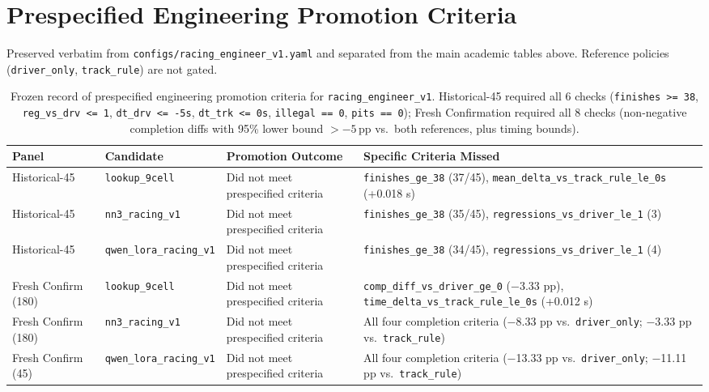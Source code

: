 \documentclass[11pt,a4paper]{article}
\begin{document}
\appendix
\section{Prespecified Engineering Promotion Criteria}

Preserved verbatim from \texttt{configs/racing\_engineer\_v1.yaml} and separated from the main academic tables above. Reference policies (\texttt{driver\_only}, \texttt{track\_rule}) are not gated.

\begin{table}[htbp]
\centering
\caption{Frozen record of prespecified engineering promotion criteria for \texttt{racing\_engineer\_v1}. Historical-45 required all 6 checks (\texttt{finishes >= 38}, \texttt{reg\_vs\_drv <= 1}, \texttt{dt\_drv <= -5s}, \texttt{dt\_trk <= 0s}, \texttt{illegal == 0}, \texttt{pits == 0}); Fresh Confirmation required all 8 checks (non-negative completion diffs with 95\% lower bound $>-5$\,pp vs.\ both references, plus timing bounds).}
\label{tab:appendix_gates}
\footnotesize
\begin{tabular}{ll>{\raggedright\arraybackslash}p{4.0cm}>{\raggedright\arraybackslash}p{6.0cm}}
\toprule
Panel & Candidate & Promotion Outcome & Specific Criteria Missed \\
\midrule
Historical-45 & \texttt{lookup\_9cell} & Did not meet prespecified criteria & \texttt{finishes\_ge\_38} (37/45), \texttt{mean\_delta\_vs\_track\_rule\_le\_0s} (+0.018 s) \\
Historical-45 & \texttt{nn3\_racing\_v1} & Did not meet prespecified criteria & \texttt{finishes\_ge\_38} (35/45), \texttt{regressions\_vs\_driver\_le\_1} (3) \\
Historical-45 & \texttt{qwen\_lora\_racing\_v1} & Did not meet prespecified criteria & \texttt{finishes\_ge\_38} (34/45), \texttt{regressions\_vs\_driver\_le\_1} (4) \\
\midrule
Fresh Confirm (180) & \texttt{lookup\_9cell} & Did not meet prespecified criteria & \texttt{comp\_diff\_vs\_driver\_ge\_0} ($-$3.33 pp), \texttt{time\_delta\_vs\_track\_rule\_le\_0s} (+0.012 s) \\
Fresh Confirm (180) & \texttt{nn3\_racing\_v1} & Did not meet prespecified criteria & All four completion criteria ($-$8.33 pp vs.\ \texttt{driver\_only}; $-$3.33 pp vs.\ \texttt{track\_rule}) \\
Fresh Confirm (45) & \texttt{qwen\_lora\_racing\_v1} & Did not meet prespecified criteria & All four completion criteria ($-$13.33 pp vs.\ \texttt{driver\_only}; $-$11.11 pp vs.\ \texttt{track\_rule}) \\
\bottomrule
\end{tabular}
\end{table}
\end{document}
